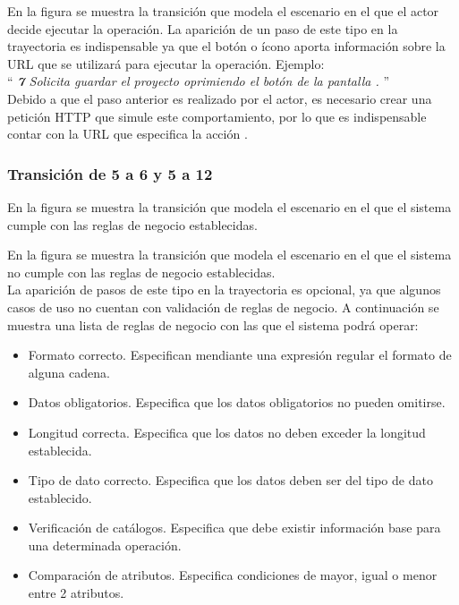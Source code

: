  En la figura  se muestra la transición que modela el escenario en el que el actor decide ejecutar la operación.
La aparición de un paso de este tipo en la trayectoria es indispensable ya que el botón o ícono aporta información sobre la URL que se utilizará para ejecutar la operación. Ejemplo:\\

``{\it
    {\bf 7} \UCactor Solicita guardar el proyecto oprimiendo el botón  de la pantalla .  
}''\\

	Debido a que el paso anterior es realizado por el actor, es necesario crear una petición HTTP que simule este comportamiento, por lo que es indispensable contar con la URL que especifica la acción .\\
	  
\subsubsection{Transición de 5 a 6 y 5 a 12}
 
 En la figura  se muestra la transición que modela el escenario en el que el sistema cumple con las reglas de negocio establecidas.
  
 
 En la figura  se muestra la transición que modela el escenario en el que el sistema no cumple con las reglas de negocio establecidas.\\
  
  
 La aparición de pasos de este tipo en la trayectoria es opcional, ya que algunos casos de uso no cuentan con validación de reglas de negocio. A continuación se muestra una lista de reglas de negocio con las que el sistema podrá operar:
 
 \begin{itemize}
	 \item Formato correcto. Especifican mendiante una expresión regular el formato de alguna cadena.
	 \item Datos obligatorios. Especifica que los datos obligatorios no pueden omitirse.
	 \item Longitud correcta. Especifica que los datos no deben exceder la longitud establecida.
	 \item Tipo de dato correcto. Especifica que los datos deben ser del tipo de dato establecido.
	 \item Verificación de catálogos. Especifica que debe existir información base para una determinada operación.
	 \item Comparación de atributos. Especifica condiciones de mayor, igual o menor entre 2 atributos.\\
 \end{itemize}
 

